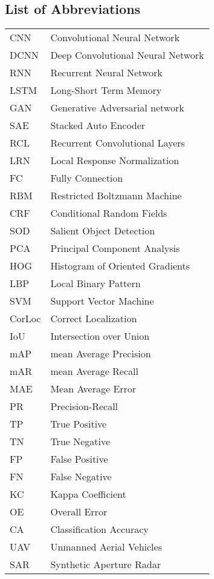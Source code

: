 \begin{appendices}


\chapter{List of Abbreviations}


\noindent 

\begin{tabular}{@{}ll}

CNN & Convolutional Neural Network \\
DCNN & Deep Convolutional Neural Network \\
RNN & Recurrent Neural Network\\
LSTM & Long-Short Term Memory \\
GAN & Generative Adversarial network \\
SAE & Stacked Auto Encoder \\
RCL & Recurrent Convolutional Layers\\
LRN & Local Response Normalization \\
FC & Fully Connection \\
RBM & Restricted Boltzmann Machine \\

CRF & Conditional Random Fields \\
SOD & Salient Object Detection \\
PCA & Principal Component Analysis \\
HOG & Histogram of Oriented Gradients \\
LBP & Local Binary Pattern \\
SVM & Support Vector Machine \\

CorLoc & Correct Localization \\
IoU & Intersection over Union \\
mAP & mean Average Precision \\
mAR & mean Average Recall \\
MAE & Mean Average Error \\
PR & Precision-Recall \\
TP & True Positive \\
TN & True Negative \\
FP & False Positive \\
FN & False Negative \\
KC & Kappa Coefficient \\
OE & Overall Error \\
CA & Classification Accuracy \\

UAV & Unmanned Aerial Vehicles \\
SAR & Synthetic Aperture Radar \\


\end{tabular}

\end{appendices}